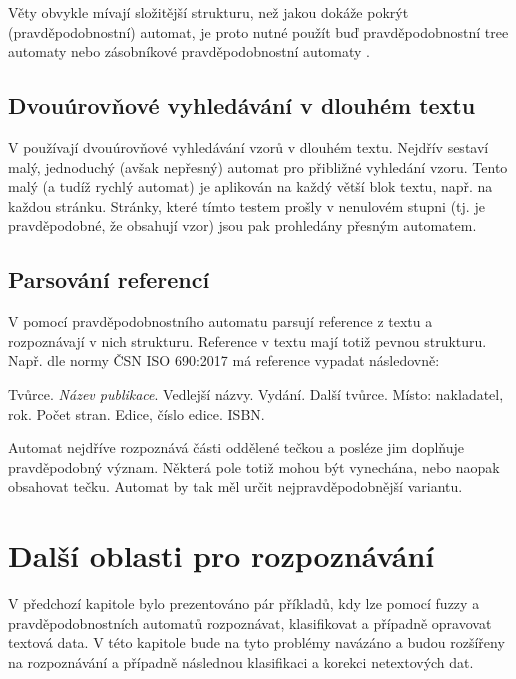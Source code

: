 \documentclass[a4paper,10pt]{article}
\begin{document}
Věty obvykle mívají složitější strukturu, než jakou dokáže pokrýt  (pravděpodobnostní) automat, je proto nutné použít buď pravděpodobnostní tree automaty \cite{KniGra-OvProTreTraNatLanPro} nebo zásobníkové pravděpodobnostní automaty \cite{WaMan-ProFiStMaRegBaMTEva}.

\subsection{Dvouúrovňové vyhledávání v dlouhém textu}

V \cite{Hun-NoLiTexSeaUsFuFiStLiNoDetAut} používají dvouúrovňové vyhledávání vzorů v dlouhém textu. Nejdřív sestaví malý, jednoduchý (avšak nepřesný) automat pro přibližné vyhledání vzoru. Tento malý (a tudíž rychlý automat) je aplikován na každý větší blok textu, např. na každou stránku. Stránky, které tímto testem prošly v nenulovém stupni (tj. je pravděpodobné, že obsahují vzor) jsou pak prohledány přesným automatem.

\subsection{Parsování referencí}
V \cite{Kra+-BibMeExUsiPrFiStTra} pomocí pravděpodobnostního automatu parsují reference z textu a rozpoznávají v nich strukturu. Reference v textu mají totiž pevnou strukturu. Např. dle normy ČSN ISO 690:2017\cite{web-CesCitNorm} má reference vypadat následovně:

Tvůrce. \textit{Název publikace}. Vedlejší názvy. Vydání. Další tvůrce. Místo: nakladatel, rok. Počet stran. Edice, číslo edice. ISBN.

Automat nejdříve rozpoznává části oddělené tečkou a posléze jim doplňuje pravděpodobný význam. Některá pole totiž mohou být vynechána, nebo naopak obsahovat tečku. Automat by tak měl určit nejpravděpodobnější variantu.

\section{Další oblasti pro rozpoznávání}
V předchozí kapitole bylo prezentováno pár příkladů, kdy lze pomocí fuzzy a pravděpodobnostních automatů rozpoznávat, klasifikovat a případně opravovat textová data. V této kapitole bude na tyto problémy navázáno a budou rozšířeny na rozpoznávání a případně následnou klasifikaci a korekci netextových dat.
\end{document}
